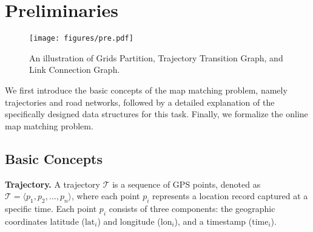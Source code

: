 \section{Preliminaries}
\label{sec:2}
\begin{figure}
  \centering  
  \texttt{[image: figures/pre.pdf]}
  \vspace{-0.15in}
  \caption{An illustration of Grids Partition, Trajectory Transition Graph, and Link Connection Graph.}
  \vspace{-0.25in}
  \label{fig:pre}
\end{figure}


We first introduce the basic concepts of the map matching problem, namely trajectories and road networks, followed by a detailed explanation of the specifically designed data structures for this task. Finally, we formalize the online map matching problem.

\subsection{Basic Concepts}

\noindent \textbf{Trajectory.} A trajectory $\mathcal{T}$ is a sequence of GPS points, denoted as $\mathcal{T} = \langle p_1, p_2, \ldots, p_n \rangle$, where each point $p_i$ represents a location record captured at a specific time. Each point $p_i$ consists of three components: the geographic coordinates latitude ($\text{lat}_i$) and longitude ($\text{lon}_i$), and a timestamp ($\text{time}_i$).

